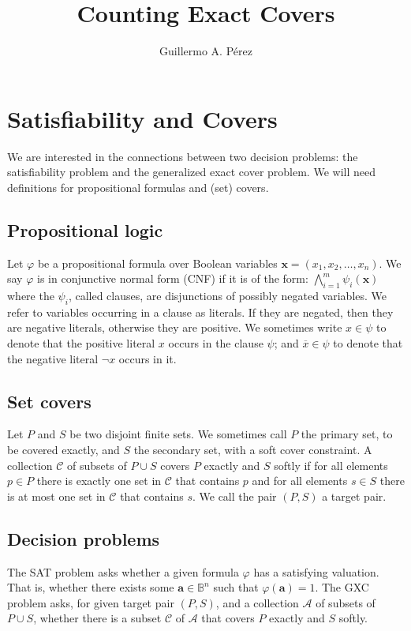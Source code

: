 \documentclass[a4paper]{article}
\title{Counting Exact Covers}
\author{Guillermo A. P\'erez}
\renewcommand{\vec}[1]{\boldsymbol{#1}}
\begin{document}
\maketitle

\section{Satisfiability and Covers}
We are interested in the connections between two decision problems: the
satisfiability problem and the generalized exact cover problem.
We will need definitions for propositional formulas and (set) covers.

\subsection{Propositional logic}
Let $\varphi$ be a propositional formula over Boolean variables $\vec{x} = (x_1,
x_2, \dots, x_n)$. We say $\varphi$ is in conjunctive normal form (CNF) if it is of the
form:
\(
  \bigwedge_{i=1}^m \psi_i(\vec{x})
\)
where the $\psi_i$, called clauses, are disjunctions of possibly negated
variables. We refer to variables occurring in a clause as literals. If they are
negated, then they are negative literals, otherwise they are positive. We
sometimes write $x \in \psi$ to denote that the positive literal $x$
occurs in the clause $\psi$; and $\overline{x} \in \psi$ to denote that the
negative literal $\lnot x$ occurs in it.

\subsection{Set covers}
Let $P$ and $S$ be two disjoint finite sets. We sometimes call $P$ the primary
set, to be covered exactly, and $S$ the secondary set, with a soft cover
constraint. A collection $\mathcal{C}$ of subsets of $P \cup S$ covers
$P$ exactly and $S$ softly if for all elements $p \in P$ there is exactly one set in
$\mathcal{C}$ that contains $p$ and for all elements $s \in S$ there is at
most one set in $\mathcal{C}$ that contains $s$. We call the pair $(P,S)$ a
target pair.

\subsection{Decision problems}
The
\textsc{SAT} problem asks whether a given formula $\varphi$ has a satisfying
valuation. That is, whether there exists some $\vec{a} \in \mathbb{B}^n$ such
that $\varphi(\vec{a}) = 1$.  The \textsc{GXC} problem asks, for given target
pair $(P,S)$, and a collection $\mathcal{A}$ of subsets of $P \cup S$, whether
there is a subset $\mathcal{C}$ of $\mathcal{A}$ that covers $P$ exactly and
$S$ softly.
\end{document}
